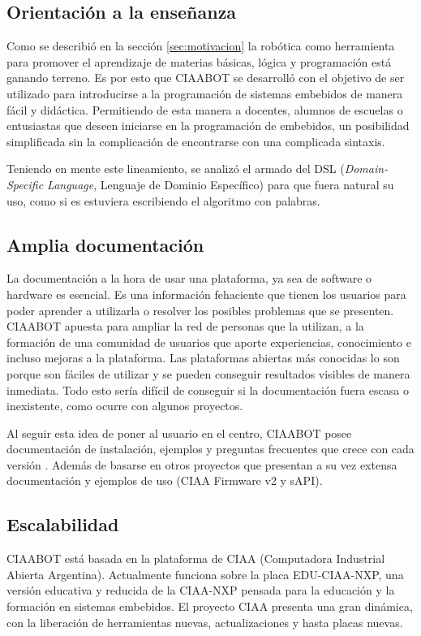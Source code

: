 \subsection{Orientación a la enseñanza}
\label{subsec:orientacion}
Como se describió en la sección \ref{sec:motivacion} la robótica como herramienta para promover el aprendizaje de materias básicas, lógica y programación está ganando terreno. Es por esto que CIAABOT se desarrolló con el objetivo de ser utilizado para introducirse a la programación de sistemas embebidos de manera fácil y didáctica. Permitiendo de esta manera a docentes, alumnos de escuelas o entusiastas que deseen iniciarse en la programación de embebidos, un posibilidad simplificada sin la complicación de encontrarse con una complicada sintaxis.

Teniendo en mente este lineamiento, se analizó el armado del DSL (\emph{Domain-Specific Language}, Lenguaje de Dominio Específico) para que fuera natural su uso, como si es estuviera escribiendo el algoritmo con palabras. 

\subsection{Amplia documentación}
\label{subsec:ampliaDoc}
La documentación a la hora de usar una plataforma, ya sea de software o hardware es esencial. Es una información fehaciente que tienen los usuarios para poder aprender a utilizarla o resolver los posibles problemas que se presenten. CIAABOT apuesta para ampliar la red de personas que la utilizan, a la formación de una comunidad de usuarios que aporte experiencias, conocimiento e incluso mejoras a la plataforma. Las plataformas abiertas más conocidas lo son porque son fáciles de utilizar y se pueden conseguir resultados visibles de manera inmediata. Todo esto sería difícil de conseguir si la documentación fuera escasa o inexistente, como ocurre con algunos proyectos.

Al seguir esta idea de poner al usuario en el centro, CIAABOT posee documentación de instalación, ejemplos y preguntas frecuentes que crece con cada versión \citep{CIAABOT:documentacion}. Además de basarse en otros proyectos que presentan a su vez extensa documentación y ejemplos de uso (CIAA Firmware v2 y sAPI).

\subsection{Escalabilidad}
\label{subsec:escalabilidad}
CIAABOT está basada en la plataforma de CIAA \citep{CIAA}(Computadora Industrial Abierta Argentina). Actualmente funciona sobre la placa EDU-CIAA-NXP, una versión educativa y reducida de la CIAA-NXP pensada para la educación y la formación en sistemas embebidos. El proyecto CIAA presenta una gran dinámica, con la liberación de herramientas nuevas, actualizaciones y hasta placas nuevas. 

